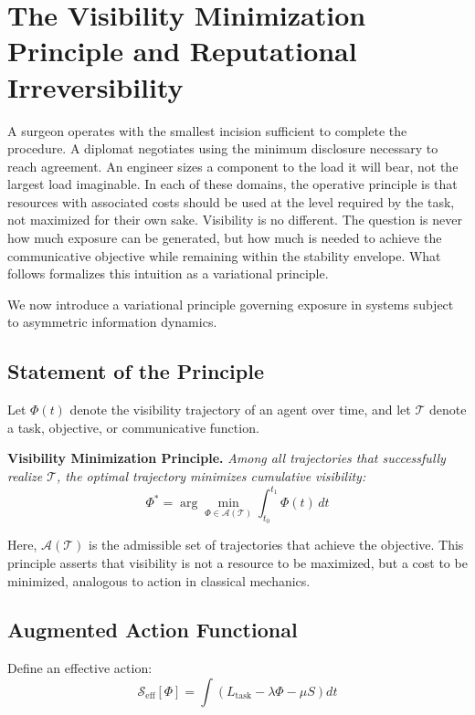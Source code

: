 \documentclass[12pt,a4paper]{article}
\begin{document}
\section{The Visibility Minimization Principle and Reputational Irreversibility}

A surgeon operates with the smallest incision sufficient to complete the procedure. A diplomat negotiates using the minimum disclosure necessary to reach agreement. An engineer sizes a component to the load it will bear, not the largest load imaginable. In each of these domains, the operative principle is that resources with associated costs should be used at the level required by the task, not maximized for their own sake. Visibility is no different. The question is never how much exposure can be generated, but how much is needed to achieve the communicative objective while remaining within the stability envelope. What follows formalizes this intuition as a variational principle.

We now introduce a variational principle governing exposure in systems subject to asymmetric information dynamics.

\subsection{Statement of the Principle}

Let $\Phi(t)$ denote the visibility trajectory of an agent over time, and let $\mathcal{T}$ denote a task, objective, or communicative function.

\medskip

\noindent
\textbf{Visibility Minimization Principle.}
\emph{Among all trajectories that successfully realize $\mathcal{T}$, the optimal trajectory minimizes cumulative visibility:}
\[
\Phi^\ast = \arg\min_{\Phi \in \mathcal{A}(\mathcal{T})} \int_{t_0}^{t_1} \Phi(t)\,dt
\]

\medskip

Here, $\mathcal{A}(\mathcal{T})$ is the admissible set of trajectories that achieve the objective. This principle asserts that visibility is not a resource to be maximized, but a cost to be minimized, analogous to action in classical mechanics.

\subsection{Augmented Action Functional}

Define an effective action:
\[
\mathcal{S}_{\text{eff}}[\Phi] = \int \left( L_{\text{task}} - \lambda \Phi - \mu S \right) dt
\]
\end{document}
